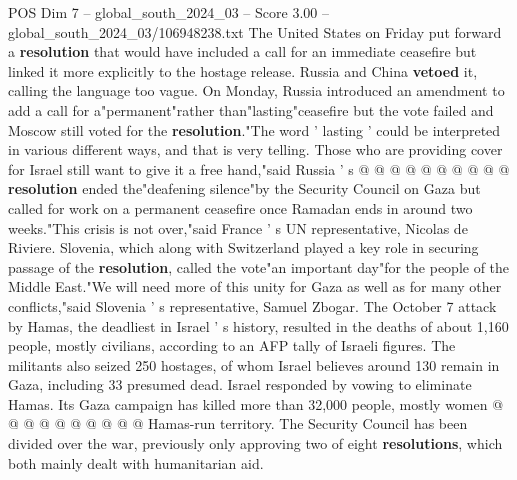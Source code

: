 \begin{textsample}{POS Dim 7 – global\_south\_2024\_03 – Score 3.00 – global\_south\_2024\_03/106948238.txt}
The United States on Friday put forward a \textbf{resolution} that would have included a call for an immediate ceasefire but linked it more explicitly to the hostage release.
Russia and China \textbf{vetoed} it, calling the language too vague.
On Monday, Russia introduced an amendment to add a call for a"permanent"rather than"lasting"ceasefire but the vote failed and Moscow still voted for the \textbf{resolution}."The word ' lasting ' could be interpreted in various different ways, and that is very telling.
Those who are providing cover for Israel still want to give it a free hand,"said Russia ' s @ @ @ @ @ @ @ @ @ @ \textbf{resolution} ended the"deafening silence"by the Security Council on Gaza but called for work on a permanent ceasefire once Ramadan ends in around two weeks."This crisis is not over,"said France ' s UN representative, Nicolas de Riviere.
Slovenia, which along with Switzerland played a key role in securing passage of the \textbf{resolution}, called the vote"an important day"for the people of the Middle East."We will need more of this unity for Gaza as well as for many other conflicts,"said Slovenia ' s representative, Samuel Zbogar.
The October 7 attack by Hamas, the deadliest in Israel ' s history, resulted in the deaths of about 1,160 people, mostly civilians, according to an AFP tally of Israeli figures.
The militants also seized 250 hostages, of whom Israel believes around 130 remain in Gaza, including 33 presumed dead.
Israel responded by vowing to eliminate Hamas.
Its Gaza campaign has killed more than 32,000 people, mostly women @ @ @ @ @ @ @ @ @ @ Hamas-run territory.
The Security Council has been divided over the war, previously only approving two of eight \textbf{resolutions}, which both mainly dealt with humanitarian aid.

\end{textsample}

